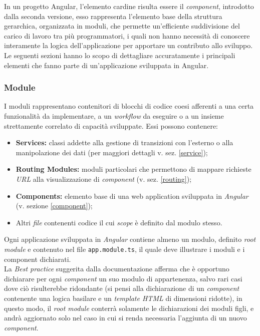 In un progetto Angular, l'elemento cardine risulta essere il \textit{component}, introdotto dalla seconda versione, esso rappresenta l'elemento base della struttura gerarchica, organizzata in moduli, che permette un'efficiente suddivisione del carico di lavoro tra più programmatori, i quali non hanno necessità di conoscere interamente la logica dell'applicazione per apportare un contributo allo sviluppo.
Le seguenti sezioni hanno lo scopo di dettagliare accuratamente i principali elementi che fanno parte di un'applicazione sviluppata in Angular.


\subsubsection{Module}
I moduli rappresentano contenitori di blocchi di codice coesi afferenti a una certa funzionalità da implementare, a un \textit{workflow} da eseguire o a un insieme strettamente correlato di capacità sviluppate.
Essi possono contenere:
\begin{itemize}
	\item \textbf{Services:} classi addette alla gestione di transizioni con l'esterno o alla manipolazione dei dati (per maggiori dettagli  v. sez. \ref{service});
	\item \textbf{Routing Modules:} moduli particolari che permettono di mappare richieste \textit{URL} alla visualizzazione di \textit{component} (v. sez. \ref{routing});
	\item \textbf{Components:} elemento base di una web application sviluppata in \textit{Angular} (v. sezione \ref{component});
	\item Altri \textit{file} contenenti codice il cui \textit{scope} è definito dal modulo stesso.
\end{itemize}
Ogni applicazione sviluppata in \textit{Angular} contiene almeno un modulo, definito \textit{root module} e contenuto nel file \texttt{app.module.ts}, il quale deve illustrare i moduli e i component dichiarati.\\
La \textit{Best practice} suggerita dalla documentazione afferma che è opportuno dichiarare per ogni \textit{component} un suo modulo di appartenenza, salvo rari casi dove ciò risulterebbe ridondante (si pensi alla dichiarazione di un \textit{component} contenente una logica basilare e un \textit{template HTML} di dimensioni ridotte), in questo modo, il \textit{root module} conterrà solamente le dichiarazioni dei moduli figli, e andrà aggiornato solo nel caso in cui si renda necessaria l'aggiunta di un nuovo \textit{component}.

